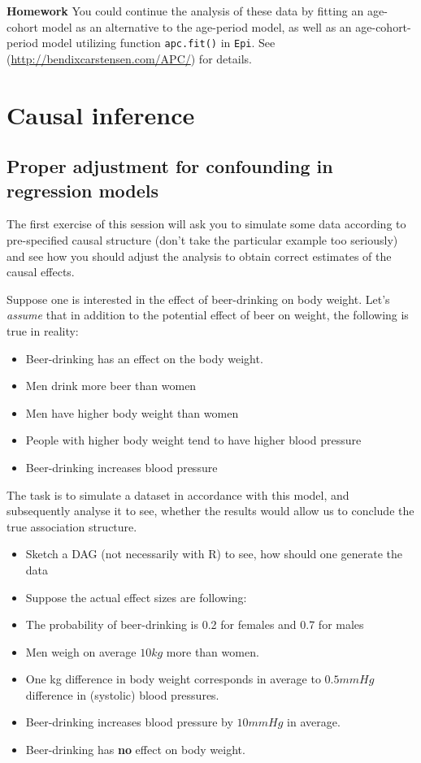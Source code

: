\documentclass[
]{book}
\providecommand{\tightlist}{%
  \setlength{\itemsep}{0pt}\setlength{\parskip}{0pt}}
\begin{document}
\textbf{Homework}
You could continue the analysis of these data by fitting an age-cohort
model as an alternative to the age-period model, as well as an
age-cohort-period model utilizing function \texttt{apc.fit()} in
\texttt{Epi}. See (\url{http://bendixcarstensen.com/APC/}) for details.

\chapter{Causal inference}\label{causal-inference}

\section{Proper adjustment for confounding in regression models}\label{proper-adjustment-for-confounding-in-regression-models}

The first exercise of this session will ask you to simulate some data
according to pre-specified causal structure (don't take the particular
example too seriously) and see how you should adjust the analysis to
obtain correct estimates of the causal effects.

Suppose one is interested in the effect of beer-drinking on body weight.
Let's \emph{assume} that in addition to the potential effect of beer on weight, the following is true in reality:

\begin{itemize}
\tightlist
\item
  Beer-drinking has an effect on the body weight.
\item
  Men drink more beer than women
\item
  Men have higher body weight than women
\item
  People with higher body weight tend to have higher blood pressure
\item
  Beer-drinking increases blood pressure
\end{itemize}

The task is to simulate a dataset in accordance with this model, and
subsequently analyse it to see, whether the results would allow us to
conclude the true association structure.

\begin{itemize}
\item
  Sketch a DAG (not necessarily with R) to see, how should one generate the data
\item
  Suppose the actual effect sizes are following:
\item
  The probability of beer-drinking is 0.2 for females and 0.7 for males
\item
  Men weigh on average \(10kg\) more than women.
\item
  One kg difference in body weight corresponds in
  average to \(0.5mmHg\) difference in (systolic) blood pressures.
\item
  Beer-drinking increases blood pressure by \(10mmHg\) in average.
\item
  Beer-drinking has \textbf{no} effect on body weight.
\end{itemize}
\end{document}
